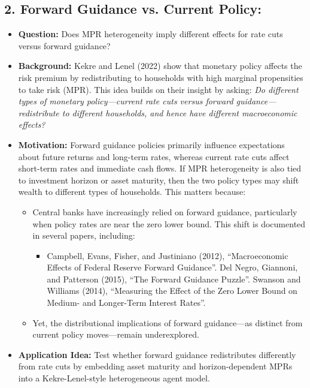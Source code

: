 \documentclass[10pt]{article}
\begin{document}
\subsection*{2. Forward Guidance vs. Current Policy:}
\begin{itemize}
\item \textbf{Question:} Does MPR heterogeneity imply different effects for rate cuts versus forward guidance?

\item \textbf{Background:}
Kekre and Lenel (2022) show that monetary policy affects the risk premium by redistributing to households with high marginal propensities to take risk (MPR). This idea builds on their insight by asking: \textit{Do different types of monetary policy—current rate cuts versus forward guidance—redistribute to different households, and hence have different macroeconomic effects?}

\item \textbf{Motivation:}
Forward guidance policies primarily influence expectations about future returns and long-term rates, whereas current rate cuts affect short-term rates and immediate cash flows. If MPR heterogeneity is also tied to investment horizon or asset maturity, then the two policy types may shift wealth to different types of households. This matters because:
\begin{itemize}
\item Central banks have increasingly relied on forward guidance, particularly when policy rates are near the zero lower bound. This shift is documented in several papers, including:
\begin{itemize}
\item Campbell, Evans, Fisher, and Justiniano (2012), ``Macroeconomic Effects of Federal Reserve Forward Guidance''. Del Negro, Giannoni, and Patterson (2015), ``The Forward Guidance Puzzle''.  Swanson and Williams (2014), ``Measuring the Effect of the Zero Lower Bound on Medium- and Longer-Term Interest Rates''.
\end{itemize}
\item Yet, the distributional implications of forward guidance—as distinct from current policy moves—remain underexplored.
\end{itemize}

\item \textbf{Application Idea:}
Test whether forward guidance redistributes differently from rate cuts by embedding asset maturity and horizon-dependent MPRs into a Kekre-Lenel-style heterogeneous agent model.


\end{itemize}
\end{document}

